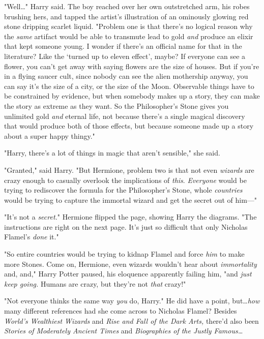 "Well…" Harry said. The boy reached over her own outstretched arm, his
robes brushing hers, and tapped the artist’s illustration of an ominously
glowing red stone dripping scarlet liquid. "Problem one is that there’s no
logical reason why the \emph{same} artifact would be able to transmute lead to
gold \emph{and} produce an elixir that kept someone young. I wonder if there’s
an official name for that in the literature? Like the ‘turned up to eleven
effect’, maybe? If everyone can see a flower, you can’t get away with saying
flowers are the size of houses. But if you’re in a flying saucer cult, since
nobody can see the alien mothership anyway, you can say it’s the size of a
city, or the size of the Moon. Observable things have to be constrained by
evidence, but when somebody makes up a story, they can make the story as
extreme as they want. So the Philosopher’s Stone gives you unlimited gold
\emph{and} eternal life, not because there’s a single magical discovery that
would produce both of those effects, but because someone made up a story about
a super happy thingy."

"Harry, there’s a lot of things in magic that aren’t sensible," she said.

"Granted," said Harry. "But Hermione, problem two is that not even
\emph{wizards} are crazy enough to casually overlook the implications of
\emph{this}. \emph{Everyone} would be trying to rediscover the formula for the
Philosopher’s Stone, whole \emph{countries} would be trying to capture the
immortal wizard and get the secret out of him—"

"It’s not a \emph{secret.}" Hermione flipped the page, showing Harry the
diagrams. "The instructions are right on the next page. It’s just so difficult
that only Nicholas Flamel’s \emph{done} it."

"So entire countries would be trying to kidnap Flamel and force \emph{him} to
make more Stones. Come on, Hermione, even wizards wouldn’t hear about
\emph{immortality} and, and," Harry Potter paused, his eloquence apparently
failing him, "and \emph{just keep going.} Humans are crazy, but they’re not
\emph{that} crazy!"

"Not everyone thinks the same way \emph{you} do, Harry." He did have a point,
but…\emph{how} many different references had she come across to
Nicholas Flamel? Besides \emph{World’s Wealthiest Wizards} and \emph{Rise and
Fall of the Dark Arts,} there’d also been \emph{Stories of Moderately Ancient
Times} and \emph{Biographies of the Justly Famous…}

